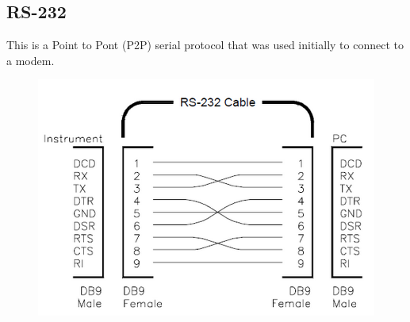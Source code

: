 \documentclass{hw}
\begin{document}
\subsection{RS-232}
This is a Point to Pont (P2P) serial protocol that was used initially to connect
to a modem.
\begin{figure}[H]
  \centering
  \includegraphics[scale=.6]{img/rs1}
\end{figure}
\end{document}
